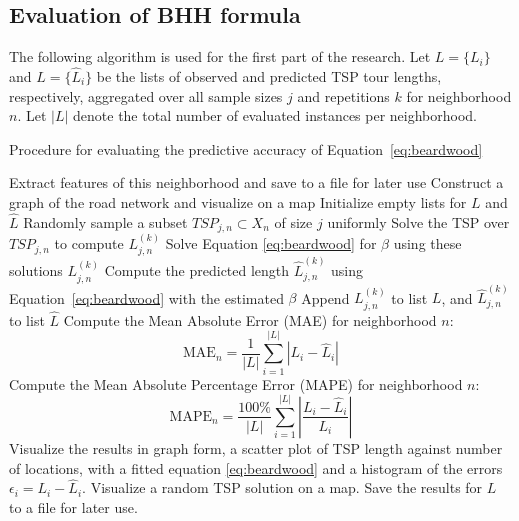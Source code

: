 \subsection{Evaluation of BHH formula}
The following algorithm is used for the first part of the research.
Let \( L = \{L_i\} \) and \( \hat{L} = \{\hat{L}_i\} \) be the lists of observed and predicted TSP tour lengths,
respectively, aggregated over all sample sizes \( j \) and repetitions \( k \) for neighborhood \( n \).
Let \( |L| \) denote the total number of evaluated instances per neighborhood.
\begin{algorithm}[H]
	\caption{Procedure for evaluating the predictive accuracy of Equation~\ref{eq:beardwood}}
	\label{alg:evaluation}
	\begin{algorithmic}[1]
		\State Extract features of this neighborhood and save to a file for later use
		\State Construct a graph of the road network and visualize on a map
		\State Initialize empty lists for \( L \) and \( \hat{L} \)
		\State Randomly sample a subset \( TSP_{j,n} \subset X_n \) of size \( j \) uniformly
		\State Solve the TSP over \( TSP_{j,n} \) to compute \( L_{j,n}^{(k)} \)
		\State Solve Equation \ref{eq:beardwood} for $\beta$ using these solutions \(L_{j,n}^{(k)}\)
		\State Compute the predicted length \( \hat{L}_{j,n}^{(k)} \) using Equation~\ref{eq:beardwood} with the estimated $\beta$
		\State Append \( L_{j,n}^{(k)} \) to list \( L \), and \( \hat{L}_{j,n}^{(k)} \) to list \( \hat{L} \)
		\EndFor
		\EndFor
		\State Compute the Mean Absolute Error (MAE) for neighborhood \( n \):
		\[
			\text{MAE}_n = \frac{1}{|L|} \sum_{i=1}^{|L|} \left| L_i - \hat{L}_i \right|
		\]
		\State Compute the Mean Absolute Percentage Error (MAPE) for neighborhood \( n \):
		\[
			\text{MAPE}_n = \frac{100\%}{|L|} \sum_{i=1}^{|L|} \left| \frac{L_i - \hat{L}_i}{L_i} \right|
		\]
		\State Visualize the results in graph form, a scatter plot of TSP length against number of locations, with
		a fitted equation \ref{eq:beardwood} and a histogram of the errors $\epsilon_i=L_i-\hat{L}_i$.
		\State Visualize a random TSP solution on a map.
		\State Save the results for $L$ to a file for later use.
		\EndFor
	\end{algorithmic}
\end{algorithm}
